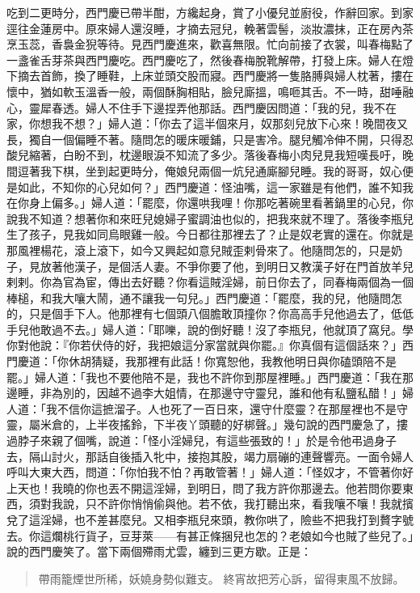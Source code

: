 吃到二更時分，西門慶已帶半酣，方纔起身，賞了小優兒並廚役，作辭回家。到家逕往金蓮房中。原來婦人還沒睡，才摘去冠兒，輓著雲髻，淡妝濃抹，正在房內茶烹玉蕊，香裊金猊等待。見西門慶進來，歡喜無限。忙向前接了衣裳，叫春梅點了一盞雀舌芽茶與西門慶吃。西門慶吃了，然後春梅脫靴解帶，打發上床。婦人在燈下摘去首飾，換了睡鞋，上床並頭交股而寢。西門慶將一隻胳膊與婦人枕著，摟在懷中，猶如軟玉溫香一般，兩個酥胸相貼，臉兒廝搵，鳴咂其舌。不一時，甜唾融心，靈犀春透。婦人不住手下邊捏弄他那話。西門慶因問道：「我的兒，我不在家，你想我不想？」婦人道：「你去了這半個來月，奴那刻兒放下心來！晚間夜又長，獨自一個偏睡不著。隨問怎的暖床暖鋪，只是害冷。腿兒觸冷伸不開，只得忍酸兒縮著，白盼不到，枕邊眼淚不知流了多少。落後春梅小肉兒見我短嘆長吁，晚間逗著我下棋，坐到起更時分，俺娘兒兩個一炕兒通廝腳兒睡。我的哥哥，奴心便是如此，不知你的心兒如何？」西門慶道：怪油嘴，這一家雖是有他們，誰不知我在你身上偏多。」婦人道：「罷麼，你還哄我哩！你那吃著碗里看著鍋里的心兒，你說我不知道？想著你和來旺兒媳婦子蜜調油也似的，把我來就不理了。落後李瓶兒生了孩子，見我如同烏眼雞一般。今日都往那裡去了？止是奴老實的還在。你就是那風裡楊花，滾上滾下，如今又興起如意兒賊歪剌骨來了。他隨問怎的，只是奶子，見放著他漢子，是個活人妻。不爭你要了他，到明日又教漢子好在門首放羊兒剌剌。你為官為宦，傳出去好聽？你看這賊淫婦，前日你去了，同春梅兩個為一個棒槌，和我大嚷大鬧，通不讓我一句兒。」西門慶道：「罷麼，我的兒，他隨問怎的，只是個手下人。他那裡有七個頭八個膽敢頂撞你？你高高手兒他過去了，低低手兒他敢過不去。」婦人道：「耶嚛，說的倒好聽！沒了李瓶兒，他就頂了窩兒。學你對他說：『你若伏侍的好，我把娘這分家當就與你罷。』你真個有這個話來？」西門慶道：「你休胡猜疑，我那裡有此話！你寬恕他，我教他明日與你磕頭陪不是罷。」婦人道：「我也不要他陪不是，我也不許你到那屋裡睡。」西門慶道：「我在那邊睡，非為別的，因越不過李大姐情，在那邊守守靈兒，誰和他有私鹽私醋！」婦人道：「我不信你這摭溜子。人也死了一百日來，還守什麼靈？在那屋裡也不是守靈，屬米倉的，上半夜搖鈴，下半夜丫頭聽的好梆聲。」幾句說的西門慶急了，摟過脖子來親了個嘴，說道：「怪小淫婦兒，有這些張致的！」於是令他弔過身子去，隔山討火，那話自後插入牝中，接抱其股，竭力扇磞的連聲響亮。一面令婦人呼叫大東大西，問道：「你怕我不怕？再敢管著！」婦人道：「怪奴才，不管著你好上天也！我曉的你也丟不開這淫婦，到明日，問了我方許你那邊去。他若問你要東西，須對我說，只不許你悄悄偷與他。若不依，我打聽出來，看我嚷不嚷！我就擯兌了這淫婦，也不差甚麼兒。又相李瓶兒來頭，教你哄了，險些不把我打到贅字號去。你這爛桃行貨子，豆芽萊——有甚正條捆兒也怎的？老娘如今也賊了些兒了。」說的西門慶笑了。當下兩個殢雨尤雲，纏到三更方歇。正是：
\begin{quote}
帶雨籠煙世所稀，妖嬈身勢似難支。
終宵故把芳心訴，留得東風不放歸。
\end{quote}

